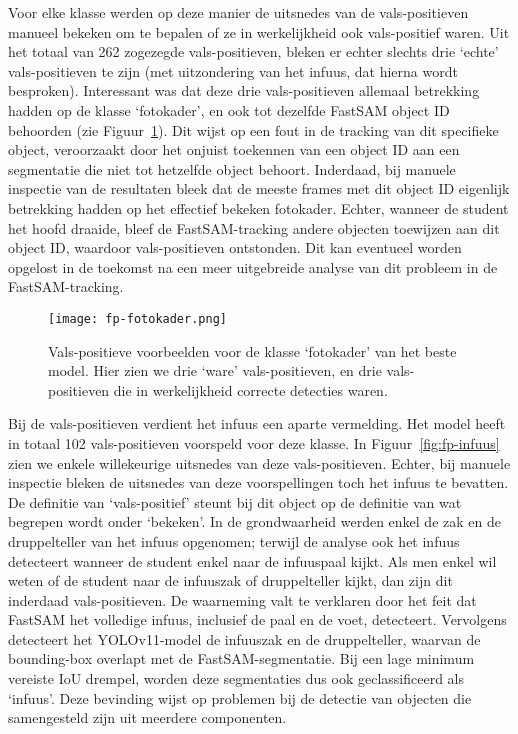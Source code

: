 Voor elke klasse werden op deze manier de uitsnedes van de vals-positieven manueel bekeken om te bepalen of ze in werkelijkheid ook vals-positief waren.
Uit het totaal van 262 zogezegde vals-positieven, bleken er echter slechts drie `echte' vals-positieven te zijn (met uitzondering van het infuus, dat hierna wordt besproken).
Interessant was dat deze drie vals-positieven allemaal betrekking hadden op de klasse `fotokader', en ook tot dezelfde FastSAM object ID behoorden (zie Figuur~\ref{fig:fp-examples-fotokader}).
Dit wijst op een fout in de tracking van dit specifieke object, veroorzaakt door het onjuist toekennen van een object ID aan een segmentatie die niet tot hetzelfde object behoort.
Inderdaad, bij manuele inspectie van de resultaten bleek dat de meeste frames met dit object ID eigenlijk betrekking hadden op het effectief bekeken fotokader.
Echter, wanneer de student het hoofd draaide, bleef de FastSAM-tracking andere objecten toewijzen aan dit object ID, waardoor vals-positieven ontstonden.
Dit kan eventueel worden opgelost in de toekomst na een meer uitgebreide analyse van dit probleem in de FastSAM-tracking.

\begin{figure}[H]
  \centering
  \texttt{[image: fp-fotokader.png]}
  \caption[
    Voorbeelden van vals-positieven voor de klasse `fotokader' van het beste model
  ]{\label{fig:fp-examples-fotokader}
    Vals-positieve voorbeelden voor de klasse `fotokader' van het beste model.
    Hier zien we drie `ware' vals-positieven, en drie vals-positieven die in werkelijkheid correcte detecties waren. 
    }
\end{figure}

Bij de vals-positieven verdient het infuus een aparte vermelding.
Het model heeft in totaal 102 vals-positieven voorspeld voor deze klasse.
In Figuur~\ref{fig:fp-infuus} zien we enkele willekeurige uitsnedes van deze vals-positieven.
Echter, bij manuele inspectie bleken de uitsnedes van deze voorspellingen toch het infuus te bevatten.
De definitie van `vals-positief' steunt bij dit object op de definitie van wat begrepen wordt onder `bekeken'.
In de grondwaarheid werden enkel de zak en de druppelteller van het infuus opgenomen;
terwijl de analyse ook het infuus detecteert wanneer de student enkel naar de infuuspaal kijkt.
Als men enkel wil weten of de student naar de infuuszak of druppelteller kijkt, dan zijn dit inderdaad vals-positieven.
De waarneming valt te verklaren door het feit dat FastSAM het volledige infuus, inclusief de paal en de voet, detecteert.
Vervolgens detecteert het YOLOv11-model de infuuszak en de druppelteller, waarvan de bounding-box overlapt met de FastSAM-segmentatie.
Bij een lage minimum vereiste IoU drempel, worden deze segmentaties dus ook geclassificeerd als `infuus'.
Deze bevinding wijst op problemen bij de detectie van objecten die samengesteld zijn uit meerdere componenten.

